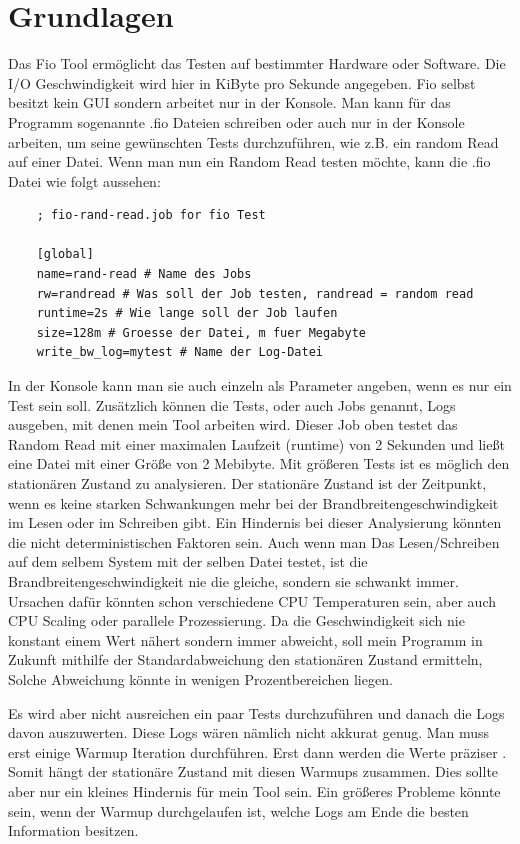 \documentclass{article}
\begin{document}
\section{Grundlagen}
Das Fio Tool ermöglicht das Testen auf bestimmter Hardware oder Software. Die I/O Geschwindigkeit wird hier in KiByte pro Sekunde angegeben.
Fio selbst besitzt kein GUI sondern arbeitet nur in der Konsole. Man kann für das Programm sogenannte .fio Dateien schreiben oder auch nur in der Konsole arbeiten,
um seine gewünschten Tests durchzuführen, wie z.B. ein random Read auf einer Datei.
Wenn man nun ein Random Read testen möchte, kann die .fio Datei wie folgt aussehen:
\bigskip
\begin{lstlisting}
    ; fio-rand-read.job for fio Test

    [global]
    name=rand-read # Name des Jobs
    rw=randread # Was soll der Job testen, randread = random read
    runtime=2s # Wie lange soll der Job laufen
    size=128m # Groesse der Datei, m fuer Megabyte
    write_bw_log=mytest # Name der Log-Datei
\end{lstlisting}
\bigskip
In der Konsole kann man sie auch einzeln als Parameter angeben, wenn es nur ein Test sein soll.
Zusätzlich können die Tests, oder auch Jobs genannt, Logs ausgeben, mit denen mein Tool arbeiten wird. Dieser Job oben testet das Random Read mit einer
maximalen Laufzeit (runtime) von 2 Sekunden und ließt eine Datei mit einer Größe von 2 Mebibyte. Mit größeren Tests ist es möglich den stationären Zustand zu analysieren. 
Der stationäre Zustand ist der Zeitpunkt, wenn es keine starken Schwankungen mehr bei der Brandbreitengeschwindigkeit im Lesen oder im Schreiben gibt.
Ein Hindernis bei dieser Analysierung könnten die nicht deterministischen Faktoren sein.
Auch wenn man Das Lesen/Schreiben auf dem selbem System mit der selben Datei testet, ist die Brandbreitengeschwindigkeit nie die gleiche, sondern sie schwankt immer. 
Ursachen dafür könnten schon verschiedene CPU Temperaturen sein, aber auch CPU Scaling oder parallele Prozessierung.
Da die Geschwindigkeit sich nie konstant einem Wert nähert sondern immer abweicht, soll mein Programm in Zukunft mithilfe der Standardabweichung den stationären Zustand ermitteln,
Solche Abweichung könnte in wenigen Prozentbereichen liegen. 

Es wird aber nicht ausreichen ein paar Tests durchzuführen und danach die Logs davon auszuwerten. Diese Logs wären nämlich nicht akkurat genug.
Man muss erst einige Warmup Iteration durchführen. Erst dann werden die Werte präziser \cite{baseline}. Somit hängt der stationäre Zustand
mit diesen Warmups zusammen. Dies sollte aber nur ein kleines Hindernis für mein Tool sein. Ein größeres Probleme könnte sein, wenn der Warmup durchgelaufen ist,
welche Logs am Ende die besten Information besitzen. \cite{whenStopPerformanceTest}
\end{document}
